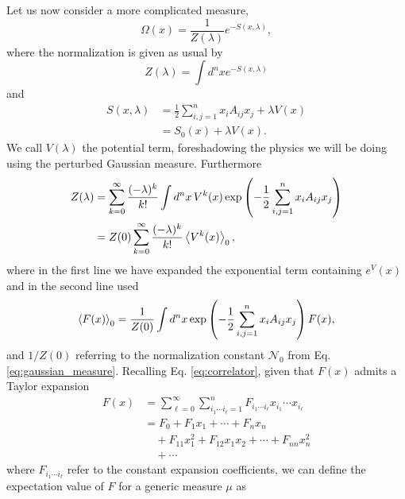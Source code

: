 \documentclass{article}
\numberwithin{equation}{section}
\begin{document}
Let us now consider a more complicated measure,
\begin{equation}
    \Omega(x) = \frac{1}{Z(\lambda)}e^{-S(x, \lambda)},
\end{equation}
where the normalization is given as usual by 
\begin{equation}
    Z(\lambda) = \int d^nx e^{-S(x,\lambda)}
\end{equation}
and
\begin{equation}
\begin{aligned}
    S(x, \lambda) &= \frac{1}{2} \sum_{i, j = 1}^n x_i A_{ij}x_j + \lambda V(x) \\
    &= S_0(x) + \lambda V(x).
\end{aligned}
\end{equation}
We call $V(\lambda)$ the potential term, foreshadowing the physics we will be doing using the perturbed Gaussian measure. Furthermore
\begin{equation}
\begin{aligned}
    Z(\lambda) &= \sum_{k=0}^\infty \frac{(-\lambda)^k}{k!} \int d^nx \, V^k(x) \exp\left(-\frac{1}{2} \sum_{i,j=1}^n x_i A_{ij} x_j\right) \\
    &= Z(0) \sum_{k=0}^\infty \frac{(-\lambda)^k}{k!} \ev{V^k(x)}_0,
\end{aligned}
\end{equation}
where in the first line we have expanded the exponential term containing $e^V(x)$ and in the second line used
\begin{equation}
    \ev{F(x)}_0 = \frac{1}{Z(0)} \int d^nx \exp\left(-\frac{1}{2} \sum_{i,j=1}^n x_i A_{ij} x_j\right) F(x),
\end{equation}
and $1/Z(0)$ referring to the normalization constant $\mathcal{N}_0$ from Eq. \ref{eq:gaussian_measure}. Recalling Eq. \ref{eq:correlator}, given that $F(x)$ admits a Taylor expansion
\begin{equation}
\begin{aligned}
    F(x) &= \sum_{\ell = 0}^\infty \sum_{i_1 \cdots i_\ell = 1}^n F_{i_1 \cdots i_\ell} x_{i_1} \cdots x_{i_\ell} \\
    &= F_0 + F_1 x_1 + \cdots + F_n x_n\\
    &\quad + F_{11} x_1^2 + F_{12} x_1 x_2 + \cdots + F_{nn} x_n^2 \\
    &\quad + \cdots
\end{aligned}
\end{equation}
where $F_{i_1 \cdots i_\ell}$ refer to the constant expansion coefficients, we can define the expectation value of $F$ for a generic measure $\mu$ as 
\end{document}
